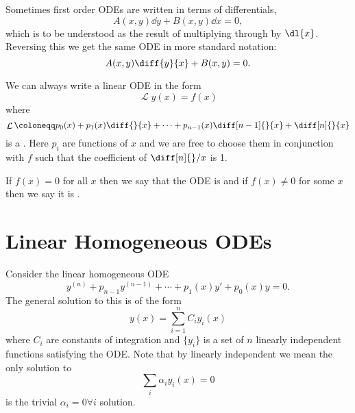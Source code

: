 \documentclass[fleqn]{NotesClass}
\DeclareMathOperator{\linop}{\mathcal{L}}
\begin{document}
    Sometimes first order ODEs are written in terms of differentials,
    \begin{equation}
        A(x, y) \dd{y} + B(x, y) \dd{x} = 0,
    \end{equation}
    which is to be understood as the result of multiplying through by \(\dl{x}\).
    Reversing this we get the same ODE in more standard notation:
    \begin{equation}
        A(x, y) \diff{y}{x} + B(x, y) = 0.
    \end{equation}
    
    We can always write a linear ODE in the form
    \begin{equation}
        \linop y(x) = f(x)
    \end{equation}
    where
    \begin{equation}
        \linop \coloneqq p_0(x) + p_1(x)\diff{}{x} + \dotsb + p_{n-1}(x) \diff[n - 1]{}{x} + \diff[n]{}{x}
    \end{equation}
    is a .
    Here \(p_i\) are functions of \(x\) and we are free to choose them in conjunction with \(f\) such that the coefficient of \(\diff[n]{}/{x}\) is 1.
    
    If \(f(x) = 0\) for all \(x\) then we say that the ODE is  and if \(f(x) \ne 0\) for some \(x\) then we say it is .
    
    \section{Linear Homogeneous ODEs}
    Consider the linear homogeneous ODE
    \begin{equation}
        y^{(n)} + p_{n-1}y^{(n-1)} + \dotsb + p_1(x)y' + p_0(x)y = 0.
    \end{equation}
    The general solution to this is of the form
    \begin{equation}
        y(x) = \sum_{i=1}^{n} C_iy_i(x)
    \end{equation}
    where \(C_i\) are constants of integration and \(\{y_i\}\) is a set of \(n\) linearly independent functions satisfying the ODE.
    Note that by linearly independent we mean the only solution to
    \begin{equation}
        \sum_{i} \alpha_i y_i(x) = 0
    \end{equation}
    is the trivial \(\alpha_i = 0 \forall i\) solution.
    
\end{document}
